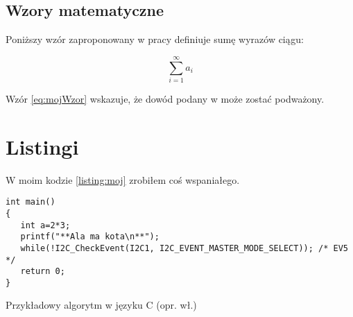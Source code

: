 \subsection{Wzory matematyczne}

Poniższy wzór zaproponowany w pracy \cite{aizawa_groundwater_2009} definiuje sumę wyrazów ciągu:

\begin{equation}
\sum_{i=1}^{\infty}a_i
\label{eq:mojWzor}
\end{equation}

Wzór \ref{eq:mojWzor} wskazuje, że dowód podany w \cite{kaleta_experimental_2005} może zostać podważony. \lipsum[1]


\section{Listingi}

W moim kodzie \ref{listing:moj} zrobiłem coś wspaniałego. \lipsum[2]

\begin{listing}
\begin{verbatim}
int main()
{
   int a=2*3;
   printf("**Ala ma kota\n**");
   while(!I2C_CheckEvent(I2C1, I2C_EVENT_MASTER_MODE_SELECT)); /* EV5 */
   return 0;
}
\end{verbatim}
\caption[Przykładowy algorytm w języku C]{Przykładowy algorytm w języku C (opr. wł.)} \label{listing:moj}
\end{listing}

